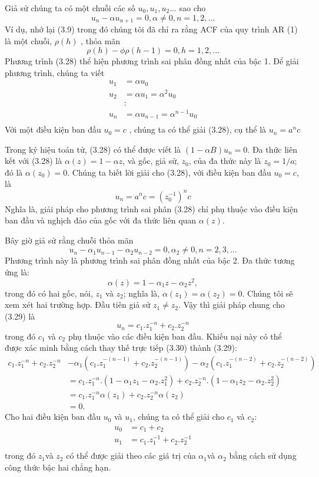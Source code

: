 \documentclass[12pt, a4paper,oneside]{book}
\theoremstyle{definition}
\begin{document}
Giả sử chúng ta có một chuỗi các số $u_{0},u_{1},u_{2}... $ sao cho
$$u_{n} - \alpha  u_{n+1} =0  ,      \alpha \neq 0      , n=1,2,... $$
Ví dụ, nhớ lại (3.9) trong đó chúng tôi đã chỉ ra rằng ACF của quy trình AR (1) là một chuỗi, $\rho(h)$ , thỏa mãn
$$\rho(h)-\phi\rho(h-1)= 0, h=1,2,...$$
Phương trình (3.28) thể hiện phương trình sai phân đồng nhất của bậc 1. Để giải phương trình, chúng ta viết
\begin{align*}
u_{1}&= \alpha u_{0}\\
u_{2}&=\alpha u_{1}= \alpha^{2} u_{0}\\
& \colon \\
u_{n}&=\alpha u_{n-1} =\alpha^{n-1} u_{0}\\	
\end{align*}
Với một điều kiện ban đầu $u_{0}=c$  , chúng ta có thể giải (3.28), cụ thể là $u_{n}=a^{n}c$

Trong ký hiệu toán tử, (3.28) có thể được viết là $(1-\alpha B) u_{n}=0$. Đa thức liên kết với (3.28) là $\alpha (z) =1-\alpha z$, và gốc, giả sử, $z_{0}$, của đa thức này là $z_{0}= 1/a$; đó là $\alpha (z_{0}) =0$. Chúng ta biết lời giải cho (3.28), với điều kiện ban đầu $u_{0}=c$, là
$$u_{n}=a^{n}c=(z_{0}^{-1})^{n}c$$
Nghĩa là, giải pháp cho phương trình sai phân (3.28) chỉ phụ thuộc vào điều kiện ban đầu và nghịch đảo của gốc với đa thức liên quan $\alpha(z)$.

Bây giờ giả sử rằng chuỗi thỏa mãn
$$u_{n}-\alpha_{1}u_{n-1}-\alpha_{2}u_{n-2}=0, \alpha_{2}\neq 0 , n=2,3,...$$
Phương trình này là phương trình sai phân đồng nhất của bậc 2. Đa thức tương ứng là:
$$\alpha(z)=1-\alpha_{1}z-\alpha_{2}z^{2},$$
trong đó có hai gốc, nói, $z_{1}$ và $z_{2}$; nghĩa là, $\alpha(z_{1})=\alpha(z_{2})=0$. Chúng tôi sẽ xem xét hai trường hợp. Đầu tiên giả sử $z_{1}\neq z_{2}$. Vậy thì giải pháp chung cho (3.29) là
$$u_{n}=c_{1}. z_{1}^{-n} + c_{2}. z_{2}^{-n}$$
trong đó $c_{1}$ và $c_{2}$ phụ thuộc vào các điều kiện ban đầu. Khiếu nại này có thể được xác minh bằng cách thay thế trực tiếp (3.30) thành (3.29):
\begin{align*}
c_{1}. z_{1}^{-n}  + c_{2}. z_{2}^{-n} &- \alpha_{1} (	c_{1}. z_{1}^{-(n-1)}+ 	c_{2}. z_{2}^{-(n-1)}) - \alpha_{2} (	c_{1}. z_{1}^{-(n-2)}+ 	c_{2}. z_{2}^{-(n-2)})\\
&= c_{1}. z_{1}^{-n}. (1-\alpha_{1}z_{1}-\alpha_{2}. z_{1}^{2}) +  c_{2}. z_{2}^{-n}. (1-\alpha_{1}z_{2}-\alpha_{2}. z_{2}^{2})\\
&=c_{1}. z_{1}^{-n}\alpha(z_{1}) + c_{2}. z_{2}^{-n}\alpha(z_{2})\\
&=0.
\end{align*}
Cho hai điều kiện ban đầu $u_{0}$ và $u_{1}$, chúng ta có thể giải cho $c_{1}$ và $c_{2}$:
\begin{align*}
u_{0}&= c_{1}+ c_{2}\\
u_{1}&=c_{1}. z_{1}^{-1} + c_{2}. z_{2}^{-1}\\
\end{align*}
trong đó $z_{1}$và $z_{2}$ có thể được giải theo các giá trị của $\alpha_{1} $và $\alpha_{2} $ bằng cách sử dụng công thức bậc hai chẳng hạn.
\end{document}
